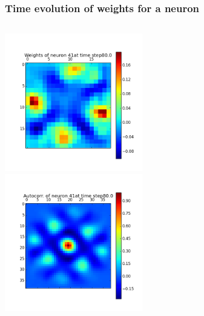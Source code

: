 \begin{frame}
\frametitle{Time evolution of weights for a neuron}
\begin{columns}[t]
\centering
\includegraphics[width=6cm,height=6cm]{neurons/neuron_w_41_t_80.png}\\
\centering
\includegraphics[width=6cm,height=6cm]{neurons/neuron_a_41_t_80.png}\\
\end{columns}
\end{frame}


